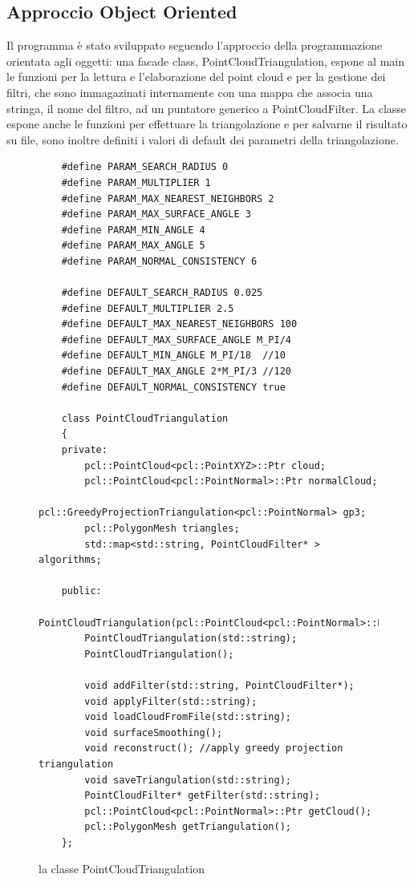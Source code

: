 \documentclass[a4paper,12pt]{article}
\begin{document}
	\subsection{Approccio Object Oriented}
	Il programma è stato sviluppato seguendo l'approccio della programmazione orientata agli oggetti: 
	una facade class, PointCloudTriangulation, espone al main le funzioni per la lettura  e l'elaborazione del point cloud
	e per la gestione dei filtri, che sono immagazinati internamente con una mappa che associa una stringa, 
	il nome del filtro, ad un puntatore generico a PointCloudFilter.	
	La classe espone anche le funzioni per effettuare la triangolazione e per salvarne il risultato su file, sono
	inoltre definiti i valori di default dei parametri della triangolazione.
	\begin{figure}[H]	
	\begin{lstlisting}	
	#define PARAM_SEARCH_RADIUS 0
	#define PARAM_MULTIPLIER 1
	#define PARAM_MAX_NEAREST_NEIGHBORS 2
	#define PARAM_MAX_SURFACE_ANGLE 3
	#define PARAM_MIN_ANGLE 4
	#define PARAM_MAX_ANGLE 5
	#define PARAM_NORMAL_CONSISTENCY 6
	
	#define DEFAULT_SEARCH_RADIUS 0.025
	#define DEFAULT_MULTIPLIER 2.5
	#define DEFAULT_MAX_NEAREST_NEIGHBORS 100
	#define DEFAULT_MAX_SURFACE_ANGLE M_PI/4 
	#define DEFAULT_MIN_ANGLE M_PI/18  //10
	#define DEFAULT_MAX_ANGLE 2*M_PI/3 //120
	#define DEFAULT_NORMAL_CONSISTENCY true
	
	class PointCloudTriangulation
	{
	private:
    	pcl::PointCloud<pcl::PointXYZ>::Ptr cloud;
    	pcl::PointCloud<pcl::PointNormal>::Ptr normalCloud;
    	pcl::GreedyProjectionTriangulation<pcl::PointNormal> gp3;
    	pcl::PolygonMesh triangles;
    	std::map<std::string, PointCloudFilter* > algorithms;
    
	public:
   		PointCloudTriangulation(pcl::PointCloud<pcl::PointNormal>::Ptr);
    	PointCloudTriangulation(std::string);
    	PointCloudTriangulation();

	    void addFilter(std::string, PointCloudFilter*);
    	void applyFilter(std::string);
    	void loadCloudFromFile(std::string);
    	void surfaceSmoothing();
    	void reconstruct(); //apply greedy projection triangulation
    	void saveTriangulation(std::string);
    	PointCloudFilter* getFilter(std::string);
    	pcl::PointCloud<pcl::PointNormal>::Ptr getCloud();
    	pcl::PolygonMesh getTriangulation();    
	};	
	\end{lstlisting}
	\label{fig:PointCloudTriangulation}
	\caption{la classe PointCloudTriangulation}
	\end{figure}
	\clearpage
	
\end{document}
